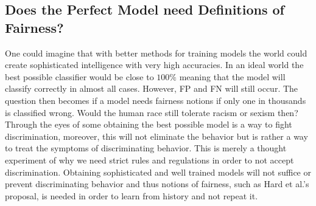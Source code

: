 \documentclass[11pt, fleqn, titlepage]{article}
\begin{document}
	\subsection{Does the Perfect Model need Definitions of Fairness?}
	One could imagine that with better methods for training models the world could create sophisticated intelligence with very high accuracies. In an ideal world the best possible classifier would be close to $ 100 \% $ meaning that the model will classify correctly in almost all cases. However, FP and FN will still occur. The question then becomes if a model needs fairness notions if only one in thousands is classified wrong. Would the human race still tolerate racism or sexism then? Through the eyes of some obtaining the best possible model is a way to fight discrimination, moreover, this will not eliminate the behavior but is rather a way to treat the symptoms of discriminating behavior. This is merely a thought experiment of why we need strict rules and regulations in order to not accept discrimination. Obtaining sophisticated and well trained models will not suffice or prevent discriminating behavior and thus notions of fairness, such as Hard et al.'s proposal, is needed in order to learn from history and not repeat it.
	
\end{document}
